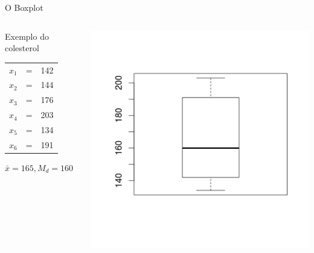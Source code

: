 \documentclass{beamer}
\begin{document}
\begin{frame}{O Boxplot}
  \begin{example}
    \begin{columns}
      \begin{column}{5cm}
        Exemplo do colesterol
        \begin{tabular}{ccc}
          $x_1$ &=&142\\
          $x_2$ &=&144\\
          $x_3$ &=&176\\
          $x_4$ &=&203\\
          $x_5$ &=&134\\
          $x_6$ &=&191\\
        \end{tabular}
        $\bar{x}=165, M_d=160$
      \end{column}
      \begin{column}{5cm}
        \includegraphics[height=0.6\textheight]{Desc_II/boxplot2}
      \end{column}
    \end{columns}
  \end{example}
\end{frame}
\end{document}
